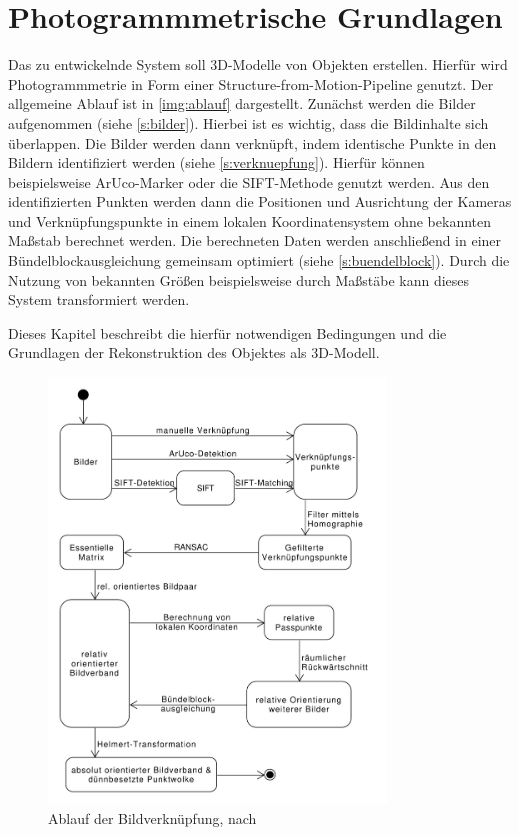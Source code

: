 \documentclass[./00PhotoBox.tex]{subfiles}
\begin{document}
\chapter{Photogrammmetrische Grundlagen}
\label{c:photogrammmetrie}
Das zu entwickelnde System soll 3D-Modelle von Objekten erstellen. Hierfür wird Photogrammmetrie in Form einer Structure-from-Motion-Pipeline genutzt.
Der allgemeine Ablauf ist in \autoref{img:ablauf} dargestellt. Zunächst werden die Bilder aufgenommen (siehe \autoref{s:bilder}). Hierbei ist es wichtig, dass die Bildinhalte sich überlappen.
Die Bilder werden dann verknüpft, indem identische Punkte in den Bildern identifiziert werden  (siehe \autoref{s:verknuepfung}). Hierfür können beispielsweise ArUco-Marker oder die SIFT-Methode genutzt werden.
Aus den identifizierten Punkten werden dann die Positionen und Ausrichtung der Kameras und Verknüpfungspunkte in einem lokalen Koordinatensystem ohne bekannten Maßstab berechnet werden. Die berechneten Daten werden anschließend in einer Bündelblockausgleichung gemeinsam optimiert (siehe \autoref{s:buendelblock}). Durch die Nutzung von bekannten Größen beispielsweise durch Maßstäbe kann dieses System transformiert werden.

Dieses Kapitel beschreibt die hierfür notwendigen Bedingungen und die Grundlagen der Rekonstruktion des Objektes als 3D-Modell.

\begin{figure}
    \centering
    \includegraphics[width=0.8\textwidth]{./img/Ablauf.pdf}
    \centering
    \caption{Ablauf der Bildverknüpfung, nach \citealt[S. 492]{luhmann}} %
    \label{img:ablauf} %
\end{figure}
\end{document}
